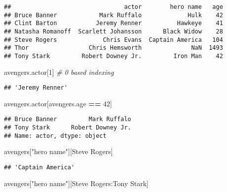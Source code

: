 \documentclass[
]{book}
\newenvironment{Shaded}{\begin{snugshade}}{\end{snugshade}}
\newcommand{\CommentTok}[1]{\textcolor[rgb]{0.56,0.35,0.01}{\textit{#1}}}
\newcommand{\DecValTok}[1]{\textcolor[rgb]{0.00,0.00,0.81}{#1}}
\newcommand{\NormalTok}[1]{#1}
\newcommand{\OperatorTok}[1]{\textcolor[rgb]{0.81,0.36,0.00}{\textbf{#1}}}
\newcommand{\StringTok}[1]{\textcolor[rgb]{0.31,0.60,0.02}{#1}}
\begin{document}
\begin{verbatim}
##                                actor        hero name   age
## Bruce Banner            Mark Ruffalo             Hulk    42
## Clint Barton           Jeremy Renner          Hawkeye    41
## Natasha Romanoff  Scarlett Johansson      Black Widow    28
## Steve Rogers             Chris Evans  Captain America   104
## Thor                 Chris Hemsworth              NaN  1493
## Tony Stark         Robert Downey Jr.         Iron Man    42
\end{verbatim}

\begin{Shaded}
\begin{Highlighting}[]
\NormalTok{avengers.actor[}\DecValTok{1}\NormalTok{] }\CommentTok{\# 0 based indexing}
\end{Highlighting}
\end{Shaded}

\begin{verbatim}
## 'Jeremy Renner'
\end{verbatim}

\begin{Shaded}
\begin{Highlighting}[]
\NormalTok{avengers.actor[avengers.age }\OperatorTok{==} \DecValTok{42}\NormalTok{]}
\end{Highlighting}
\end{Shaded}

\begin{verbatim}
## Bruce Banner         Mark Ruffalo
## Tony Stark      Robert Downey Jr.
## Name: actor, dtype: object
\end{verbatim}

\begin{Shaded}
\begin{Highlighting}[]
\NormalTok{avengers[}\StringTok{"hero name"}\NormalTok{][}\StringTok{\textquotesingle{}Steve Rogers\textquotesingle{}}\NormalTok{]}
\end{Highlighting}
\end{Shaded}

\begin{verbatim}
## 'Captain America'
\end{verbatim}

\begin{Shaded}
\begin{Highlighting}[]
\NormalTok{avengers[}\StringTok{"hero name"}\NormalTok{][}\StringTok{\textquotesingle{}Steve Rogers\textquotesingle{}}\NormalTok{:}\StringTok{\textquotesingle{}Tony Stark\textquotesingle{}}\NormalTok{]}
\end{Highlighting}
\end{Shaded}
\end{document}
